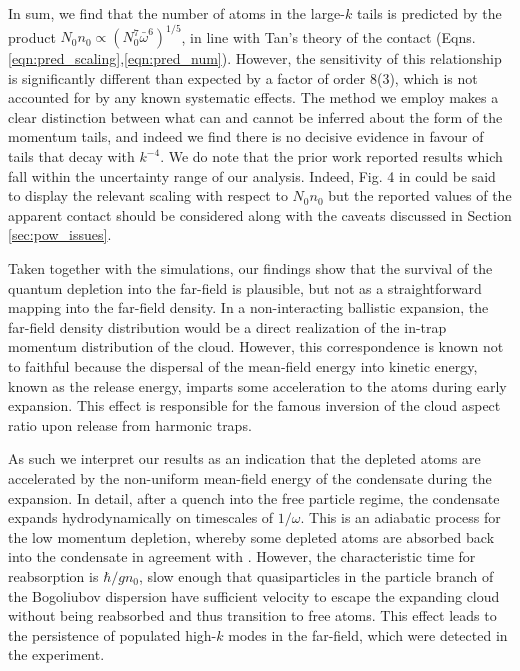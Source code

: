 	In sum, we find that the number of atoms in the large-$k$ tails is predicted by the product $N_0n_0\propto(N_{0}^7\bar{\omega}^6)^{1/5}$, in line with Tan's theory of the contact (Eqns. \ref{eqn:pred_scaling},\ref{eqn:pred_num}). 
	However, the sensitivity of this relationship is significantly different than expected by a factor of order 8(3), which is not accounted for by any known systematic effects.
	The method we employ makes a clear distinction between what can and cannot be inferred about the form of the momentum tails, and indeed we find there is no decisive evidence in favour of tails that decay with $k^{-4}$.
	We do note that the prior work \cite{Chang16} reported results which fall within the uncertainty range of our analysis.
	Indeed, Fig. 4 in \cite{Chang16} could be said to display the relevant scaling with respect to $N_0n_0$ but the reported values of the apparent contact should be considered along with the caveats discussed in Section \ref{sec:pow_issues}.
	
	Taken together with the simulations, our findings show that the survival of the quantum depletion into the far-field is plausible, but not as a straightforward mapping into the far-field density.
	In a non-interacting ballistic expansion, the far-field density distribution would be a direct realization of the in-trap momentum distribution of the cloud. 
	However, this correspondence is known not to faithful because the dispersal of the mean-field energy into kinetic energy, known as the release energy, imparts some acceleration to the atoms during early expansion. 
	This effect is responsible for the famous inversion of the cloud aspect ratio upon release from harmonic traps. 

	As such we interpret our results as an indication that the depleted atoms are accelerated by the non-uniform mean-field energy of the condensate during the expansion.
	In detail, after a quench into the free particle regime, the condensate expands hydrodynamically on timescales of $1/\omega$. 
	This is an adiabatic process for the low momentum depletion, whereby some depleted atoms are absorbed back into the condensate in agreement with \cite{Qu16}.
	However, the characteristic time for reabsorption is $\hbar/gn_0$, slow enough that quasiparticles in the particle branch of the Bogoliubov dispersion have sufficient velocity to escape the expanding cloud without being reabsorbed and thus transition to free atoms. 
	This effect leads to the persistence of populated high-$k$ modes in the far-field, which were detected in the experiment.

